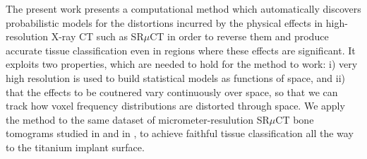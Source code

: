 
The present work presents a computational method which automatically discovers probabilistic models for the distortions incurred by the physical effects in
high-resolution X-ray CT such as SR$\mu$CT in order to reverse them and produce accurate tissue classification even in regions where these effects are significant.
It exploits two properties, which are needed to hold for the method to work:
i) very high resolution is used to build statistical models as functions of space, and ii) that the effects to be coutnered vary continuously
over space, so that we can track how voxel frequency distributions are distorted through space. We apply the method to the same dataset
of micrometer-resulution SR$\mu$CT bone tomograms studied in \cite{torsten2018} and in \cite{sporring}, to achieve faithful tissue classification
all the way to the titanium implant surface.



